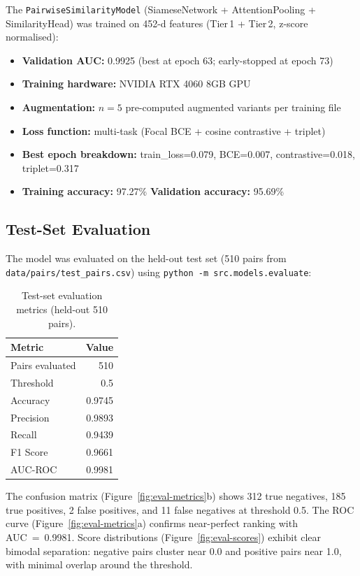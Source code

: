 \documentclass[11pt,a4paper]{article}
\begin{document}
The \texttt{PairwiseSimilarityModel} (SiameseNetwork + AttentionPooling + SimilarityHead) was trained on 452-d features (Tier\,1 + Tier\,2, z-score normalised):

\begin{itemize}[nosep]
  \item \textbf{Validation AUC:} 0.9925 (best at epoch 63; early-stopped at epoch 73)
  \item \textbf{Training hardware:} NVIDIA RTX 4060 8GB GPU
  \item \textbf{Augmentation:} $n=5$ pre-computed augmented variants per training file
  \item \textbf{Loss function:} multi-task (Focal BCE + cosine contrastive + triplet)
  \item \textbf{Best epoch breakdown:} train\_loss=0.079, BCE=0.007, contrastive=0.018, triplet=0.317
  \item \textbf{Training accuracy:} 97.27\% \quad \textbf{Validation accuracy:} 95.69\%
\end{itemize}

\subsection{Test-Set Evaluation}

The model was evaluated on the held-out test set (510 pairs from \texttt{data/pairs/test\_pairs.csv}) using \texttt{python -m src.models.evaluate}:

\begin{table}[H]
\centering
\begin{tabular}{lr}
\toprule
\textbf{Metric} & \textbf{Value} \\
\midrule
Pairs evaluated & 510 \\
Threshold & 0.5 \\
Accuracy & 0.9745 \\
Precision & 0.9893 \\
Recall & 0.9439 \\
F1 Score & 0.9661 \\
AUC-ROC & 0.9981 \\
\bottomrule
\end{tabular}
\caption{Test-set evaluation metrics (held-out 510 pairs).}
\label{tab:test-metrics}
\end{table}

\noindent
The confusion matrix (Figure~\ref{fig:eval-metrics}b) shows 312 true negatives, 185 true positives, 2 false positives, and 11 false negatives at threshold 0.5. The ROC curve (Figure~\ref{fig:eval-metrics}a) confirms near-perfect ranking with AUC~=~0.9981. Score distributions (Figure~\ref{fig:eval-scores}) exhibit clear bimodal separation: negative pairs cluster near 0.0 and positive pairs near 1.0, with minimal overlap around the threshold.
\end{document}
